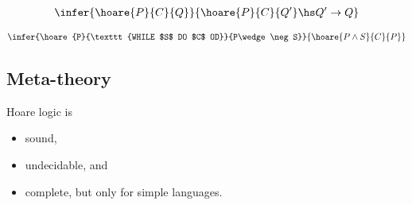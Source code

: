 \documentclass{article}
\begin{document}
\begin{definition}
    \begin{align*}
        \infer{\hoare{P}{C}{Q}}{\hoare{P}{C}{Q'}\hs Q'\to Q}
    \end{align*}
\end{definition}

\begin{definition}
    \begin{align*}
        \infer{\hoare{P}{\texttt{WHILE $S$ DO $C$ OD}}{P\wedge\neg S}}{\hoare{P\wedge S}{C}{P}}
    \end{align*}
\end{definition}

\subsection{Meta-theory}

\begin{theorem}
    Hoare logic is
    \begin{itemize}
        \item sound,
        \item undecidable, and
        \item complete, but only for simple languages.
    \end{itemize}
\end{theorem}
\end{document}
